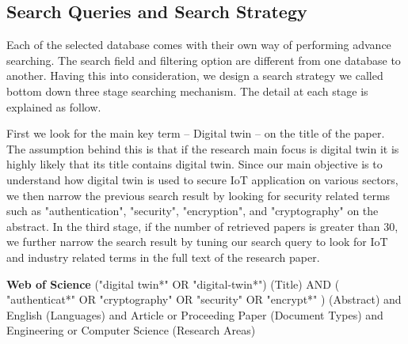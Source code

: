 \subsection{Search Queries and Search Strategy}

 Each of the selected database comes with their own way of performing advance searching. The search field and filtering option are different from one database to another. Having this into consideration, we design a search strategy we called bottom down three stage searching mechanism. The detail at each stage is explained as follow. 

First we look for the main key term -- Digital twin -- on the title of the paper. The assumption behind this is that if the research main focus is digital twin it is highly likely that its title contains digital twin. Since our main objective is to understand how digital twin is used to secure IoT application on various sectors, we then narrow the previous search result by looking for security related terms such as "authentication", "security", "encryption", and "cryptography" on the abstract. In the third stage, if the number of retrieved papers is greater than 30, we further narrow the search result by tuning our search query to look for IoT and industry related terms in the full text of the research paper. 

\begin{tcolorbox}[colback=black!5!white, sharp corners=all, colframe=white!95!black]
\textbf{Web of Science}
\tcblower
("digital twin*" OR "digital-twin*") (Title) AND ( "authenticat*" OR "cryptography" OR "security" OR "encrypt*" ) (Abstract) and English (Languages) and Article or Proceeding Paper (Document Types) and Engineering or Computer Science (Research Areas)
\end{tcolorbox}

